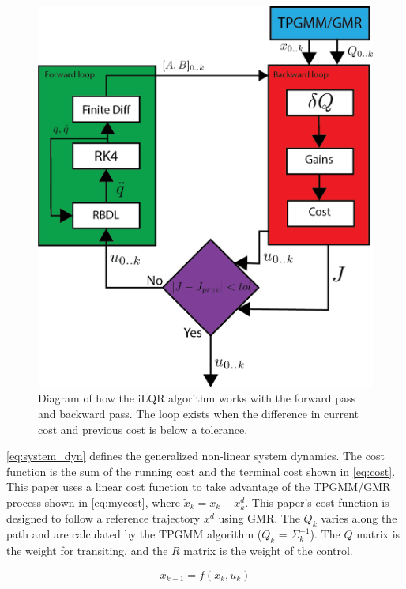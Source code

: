 \begin{figure}[h]
    \centering
    \includegraphics{images/controllers/ilqr2.png}
    \caption[iLQR Learning Loop Diagram]{Diagram of how the iLQR algorithm works with the forward pass and backward pass. The loop exists when the difference in current cost and previous cost is below a tolerance. }
    \label{fig:ilqrDiagram}
\end{figure}



\autoref{eq:system_dyn} defines the  generalized non-linear system dynamics. The cost function is the sum of the running cost and the terminal cost shown in \autoref{eq:cost}. This paper uses a linear cost function to take advantage of the TPGMM/GMR process shown in \autoref{eq:mycost}, where $\tilde{x}_k = x_k - x^{d}_k$. This paper's cost function is designed to follow a reference trajectory $x^{d}$ using GMR. The $Q_k$ varies along the path and  are calculated by the TPGMM algorithm ($Q_k$ =  $\Sigma_k^{-1}$). The  $Q$ matrix is the weight for transiting, and the $R$ matrix is the weight of the control. 

\begin{equation}
     x_{k+1} = f(x_k,u_k) 
     \label{eq:system_dyn}
\end{equation}

